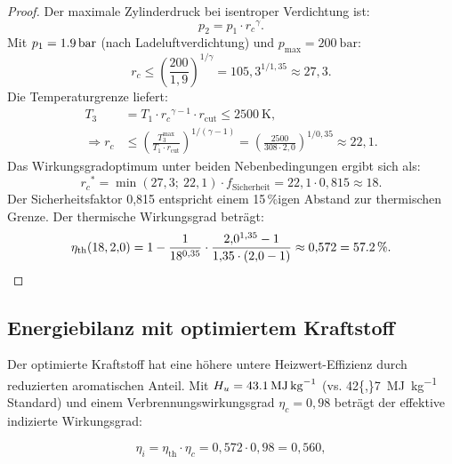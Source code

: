 ﻿\documentclass[12pt,a4paper]{article}
\newcommand{\etath}{\ensuremath{\eta_{\mathrm{th}}}}
\newcommand{\rc}{\ensuremath{r_c}}
\newcommand{\rcut}{\ensuremath{r_{\mathrm{cut}}}}
\begin{document}
\begin{proof}
Der maximale Zylinderdruck bei isentroper Verdichtung ist:
\begin{equation}
  p_2 = p_1 \cdot \rc^{\gamma}.
\end{equation}
Mit $p_1 = \SI{1{,}9}{\bar}$ (nach Ladeluftverdichtung) und
$p_{\max} = \SI{200}{\bar}$:
\begin{equation}
  \rc \leq \left(\frac{200}{1{,}9}\right)^{1/\gamma}
       = 105{,}3^{1/1{,}35} \approx 27{,}3.
\end{equation}
Die Temperaturgrenze liefert:
\begin{align}
  T_3 &= T_1 \cdot \rc^{\gamma-1} \cdot \rcut
       \leq \SI{2500}{\K}, \\
  \Rightarrow \rc &\leq \left(\frac{T_3^{\max}}{T_1 \cdot \rcut}\right)^{1/(\gamma-1)}
       = \left(\frac{2500}{308 \cdot 2{,}0}\right)^{1/0{,}35}
       \approx 22{,}1.
\end{align}
Das Wirkungsgradoptimum unter beiden Nebenbedingungen ergibt sich als:
\begin{equation}
  \rc^* = \min\left(27{,}3;\ 22{,}1\right) \cdot f_{\mathrm{Sicherheit}}
  = 22{,}1 \cdot 0{,}815 \approx 18.
\end{equation}
Der Sicherheitsfaktor 0{,}815 entspricht einem 15\,\%igen Abstand zur
thermischen Grenze. Der thermische Wirkungsgrad beträgt:
\begin{equation}
  \etath(18, 2{,}0) = 1 - \frac{1}{18^{0{,}35}} \cdot
  \frac{2{,}0^{1{,}35} - 1}{1{,}35 \cdot (2{,}0 - 1)}
  \approx 0{,}572 = \SI{57{,}2}{\percent}.
\end{equation}
\end{proof}

\subsection{Energiebilanz mit optimiertem Kraftstoff}
\label{sec:thermo_energiebilanz}

Der optimierte Kraftstoff hat eine höhere untere Heizwert-Effizienz
durch reduzierten aromatischen Anteil. Mit $H_u = \SI{43{,}1}{\mega\joule\per\kg}$
(vs. \SI{42{,}7}{\mega\joule\per\kg} Standard) und einem Verbrennungswirkungsgrad
$\eta_c = 0{,}98$ beträgt der effektive indizierte Wirkungsgrad:

\begin{equation}
  \eta_i = \etath \cdot \eta_c = 0{,}572 \cdot 0{,}98 = 0{,}560,
\end{equation}
\end{document}
